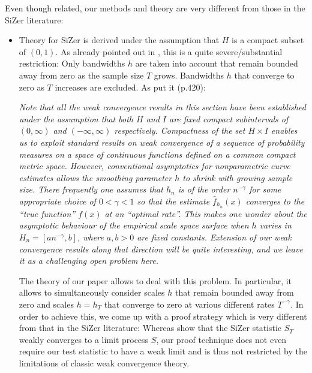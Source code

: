 \documentclass[a4paper,12pt]{article}
\begin{document}
Even though related, our methods and theory are very different from those in the SiZer literature:
\begin{itemize}[leftmargin=0.5cm]

\item Theory for SiZer is derived under the assumption that $H$ is a compact subset of $(0,1)$. As already pointed out in \cite{ChaudhuriMarron2000}, this is a quite severe/substantial restriction: Only bandwidths $h$ are taken into account that remain bounded away from zero as the sample size $T$ grows. Bandwidths $h$ that converge to zero as $T$ increases are excluded. As \cite{ChaudhuriMarron2000} put it (p.420):
\vspace{0.15cm}

\begin{spacing}{1.0}
{\small \textit{Note that all the weak convergence results in this section have been established under the assumption that both $H$ and $I$ are fixed compact subintervals of $(0,\infty)$ and $(-\infty,\infty)$ respectively. Compactness of the set $H \times I$ enables us to exploit standard results on weak convergence of a sequence of probability measures on a space of continuous functions defined on a common compact metric space. However, conventional asymptotics for nonparametric curve estimates allows the smoothing parameter $h$ to shrink with growing sample size. There frequently one assumes that $h_n$ is of the order $n^{-\gamma}$ for some appropriate choice of $0 < \gamma < 1$ so that the estimate $\hat{f}_{h_n}(x)$ converges to the ``true function'' $f(x)$ at an ``optimal rate''. This makes one wonder about the asymptotic behaviour of the empirical scale space surface when $h$ varies in $H_n = [a n^{-\gamma},b]$, where $a,b > 0$ are fixed constants. Extension of our weak convergence results along that direction will be quite interesting, and we leave it as a challenging open problem here.} }
\end{spacing} 
\vspace{0.2cm}

The theory of our paper allows to deal with this problem. In particular, it allows to simultaneously consider scales $h$ that remain bounded away from zero and scales $h = h_T$ that converge to zero at various different rates $T^{-\gamma}$. In order to achieve this, we come up with a proof strategy which is very different from that in the SiZer literature: Whereas \cite{ChaudhuriMarron2000} show that the SiZer statistic $S_T$ weakly converges to a limit process $S$, our proof technique does not even require our test statistic to have a weak limit and is thus not restricted by the limitations of classic weak convergence theory. 


\end{itemize}
\end{document}
